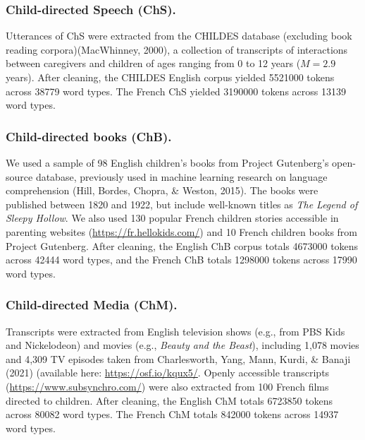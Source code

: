 \documentclass[10pt, letterpaper]{article}
\begin{document}
\hypertarget{child-directed-speech-chs.}{%
\subsubsection{Child-directed Speech
(ChS).}\label{child-directed-speech-chs.}}

Utterances of ChS were extracted from the CHILDES database (excluding
book reading corpora)(MacWhinney, 2000), a collection of transcripts of
interactions between caregivers and children of ages ranging from 0 to
12 years (\(M=2.9\) years). After cleaning, the CHILDES English corpus
yielded 5521000 tokens across 38779 word types. The French ChS yielded
3190000 tokens across 13139 word types.

\hypertarget{child-directed-books-chb.}{%
\subsubsection{Child-directed books
(ChB).}\label{child-directed-books-chb.}}

We used a sample of 98 English children's books from Project Gutenberg's
open-source database, previously used in machine learning research on
language comprehension (Hill, Bordes, Chopra, \& Weston, 2015). The
books were published between 1820 and 1922, but include well-known
titles as \emph{The Legend of Sleepy Hollow}. We also used 130 popular
French children stories accessible in parenting websites
(\url{https://fr.hellokids.com/}) and 10 French children books from
Project Gutenberg. After cleaning, the English ChB corpus totals 4673000
tokens across 42444 word types, and the French ChB totals 1298000 tokens
across 17990 word types.

\hypertarget{child-directed-media-chm.}{%
\subsubsection{Child-directed Media
(ChM).}\label{child-directed-media-chm.}}

Transcripts were extracted from English television shows (e.g., from PBS
Kids and Nickelodeon) and movies (e.g., \emph{Beauty and the Beast}),
including 1,078 movies and 4,309 TV episodes taken from Charlesworth,
Yang, Mann, Kurdi, \& Banaji (2021) (available here:
\url{https://osf.io/kqux5/}. Openly accessible transcripts
(\url{https://www.subsynchro.com/}) were also extracted from 100 French
films directed to children. After cleaning, the English ChM totals
6723850 tokens across 80082 word types. The French ChM totals 842000
tokens across 14937 word types.
\end{document}
